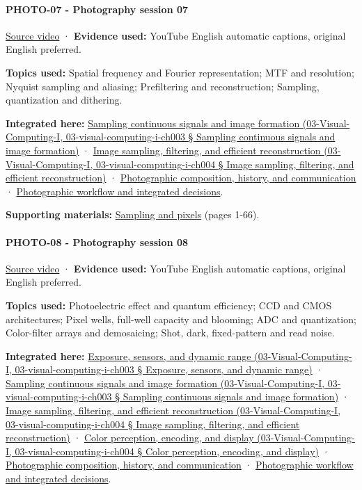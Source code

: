\paragraph{PHOTO-07 - Photography session 07}\label{photo-07---photography-session-07}

\href{https://www.youtube.com/watch?v=02tgqvQzp0Y}{Source video} · \textbf{Evidence used:} YouTube English automatic captions, original English preferred.

\textbf{Topics used:} Spatial frequency and Fourier representation; MTF and resolution; Nyquist sampling and aliasing; Prefiltering and reconstruction; Sampling, quantization and dithering.

\textbf{Integrated here:} \href{}{Sampling continuous signals and image formation (03-Visual-Computing-I, 03-visual-computing-i-ch003 § Sampling continuous signals and image formation)} · \href{}{Image sampling, filtering, and efficient reconstruction (03-Visual-Computing-I, 03-visual-computing-i-ch004 § Image sampling, filtering, and efficient reconstruction)} · \hyperref[04-visual-computing-ii-ch034]{Photographic composition, history, and communication} · \hyperref[04-visual-computing-ii-ch034]{Photographic workflow and integrated decisions}.

\textbf{Supporting materials:} \href{https://drive.google.com/open?id=0B6w2XfPHEcZYc1lhZjNHU1NNVDQ}{Sampling and pixels} (pages 1-66).

\paragraph{PHOTO-08 - Photography session 08}\label{photo-08---photography-session-08}

\href{https://www.youtube.com/watch?v=VSdUlxgpKn4}{Source video} · \textbf{Evidence used:} YouTube English automatic captions, original English preferred.

\textbf{Topics used:} Photoelectric effect and quantum efficiency; CCD and CMOS architectures; Pixel wells, full-well capacity and blooming; ADC and quantization; Color-filter arrays and demosaicing; Shot, dark, fixed-pattern and read noise.

\textbf{Integrated here:} \href{}{Exposure, sensors, and dynamic range (03-Visual-Computing-I, 03-visual-computing-i-ch003 § Exposure, sensors, and dynamic range)} · \href{}{Sampling continuous signals and image formation (03-Visual-Computing-I, 03-visual-computing-i-ch003 § Sampling continuous signals and image formation)} · \href{}{Image sampling, filtering, and efficient reconstruction (03-Visual-Computing-I, 03-visual-computing-i-ch004 § Image sampling, filtering, and efficient reconstruction)} · \href{}{Color perception, encoding, and display (03-Visual-Computing-I, 03-visual-computing-i-ch004 § Color perception, encoding, and display)} · \hyperref[04-visual-computing-ii-ch034]{Photographic composition, history, and communication} · \hyperref[04-visual-computing-ii-ch034]{Photographic workflow and integrated decisions}.

